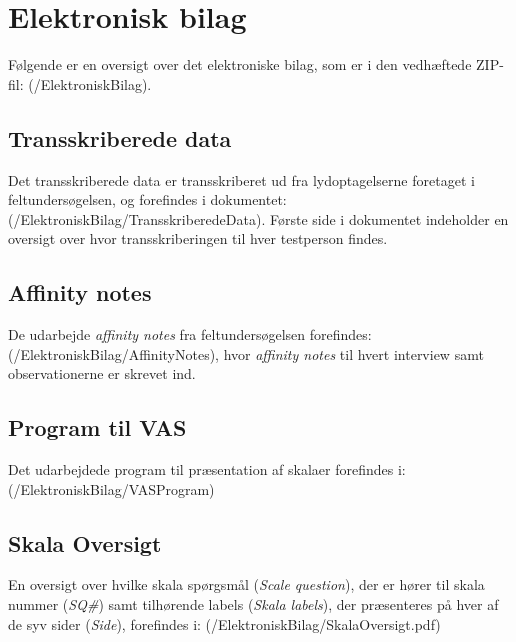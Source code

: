 
\chapter{Elektronisk bilag}
\label{ElektroniskBilagOversigt}
%
Følgende er en oversigt over det elektroniske bilag, som er i den vedhæftede ZIP-fil: (/ElektroniskBilag).

\section{Transskriberede data}
\label{ElektroniskBilagTranskriberede}
%
Det transskriberede data er transskriberet ud fra lydoptagelserne foretaget i feltundersøgelsen, og forefindes i dokumentet: (/ElektroniskBilag/TransskriberedeData). Første side i dokumentet indeholder en oversigt over hvor transskriberingen til hver testperson findes. 

\section{Affinity notes}
\label{ElektroniskBilagAffinityNotes}
%
De udarbejde \textit{affinity notes} fra feltundersøgelsen forefindes: (/ElektroniskBilag/AffinityNotes), hvor \textit{affinity notes} til hvert interview samt observationerne er skrevet ind. 

\section{Program til VAS}
\label{ElektroniskBilagProgram}
%
Det udarbejdede program til præsentation af skalaer forefindes i: (/ElektroniskBilag/VASProgram)

\section{Skala Oversigt}
\label{ElektroniskBilagSkalaOversigt}
%
En oversigt over hvilke skala spørgsmål (\textit{Scale question}), der er hører til skala nummer (\textit{SQ\#}) samt tilhørende labels (\textit{Skala labels}), der præsenteres på hver af de syv sider (\textit{Side}), forefindes i: (/ElektroniskBilag/SkalaOversigt.pdf)

